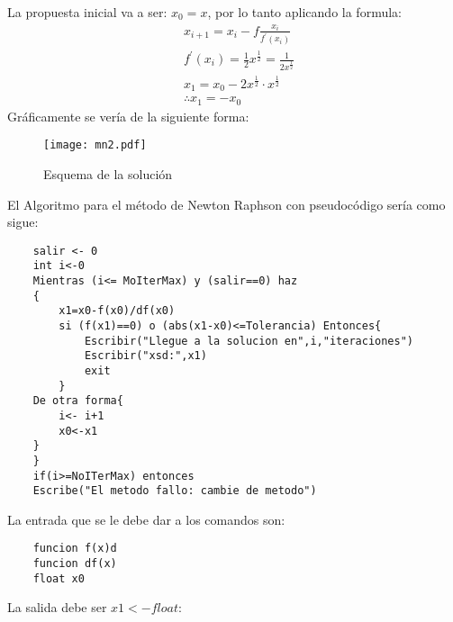 La propuesta inicial va a ser: $x_0=x$, por lo tanto aplicando la formula:
\begin{align*}
    &x_{i + 1 }= x_i - f\frac{x_i}{f^{\prime}(x_i)}\\
    &f^{\prime}(x_i) = \frac{1}{2}x^{\frac{1}{2}} = \frac{1}{2x^{\frac{1}{2}}}\\
    &x_1 = x_{0} - 2x^{\frac{1}{2}}\cdot x^{\frac{1}{2}}\\
    &\therefore x_1= - x_0
\end{align*}
Gráficamente se vería de la siguiente forma:
\begin{figure}[h!]
\centering
  \texttt{[image: mn2.pdf]}
  \caption{Esquema de la solución}
  \label{mn2}
\end{figure}
El Algoritmo para el método de Newton Raphson con pseudocódigo sería como sigue:
\begin{lstlisting}
    salir <- 0
    int i<-0
    Mientras (i<= MoIterMax) y (salir==0) haz
    {
        x1=x0-f(x0)/df(x0)
        si (f(x1)==0) o (abs(x1-x0)<=Tolerancia) Entonces{
            Escribir("Llegue a la solucion en",i,"iteraciones")
            Escribir("xsd:",x1)
            exit
        }
    De otra forma{
        i<- i+1
        x0<-x1
    }
    }
    if(i>=NoITerMax) entonces
    Escribe("El metodo fallo: cambie de metodo")
\end{lstlisting}
La entrada que se le debe dar a los comandos son:
\begin{lstlisting}
    funcion f(x)d
    funcion df(x)
    float x0
\end{lstlisting}
La salida debe ser $x1<- float$:

